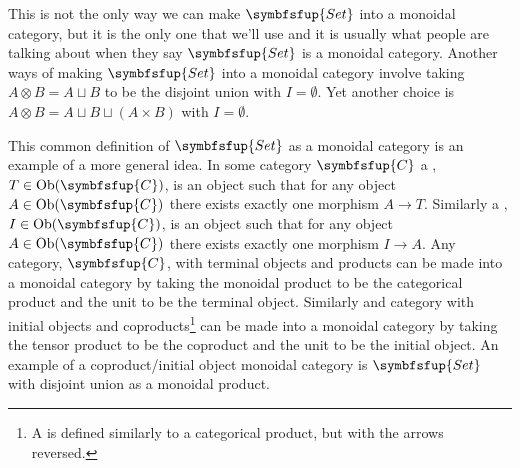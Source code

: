 \documentclass[fleqn]{NotesClass}
\makeatletter
\newcommand{\cat}[1]{\symbfsfup{#1}}
\newcommand{\c@egory}[1]{\symbfsfup{#1}}
\newcommand{\Set}{\c@egory{Set}}
\DeclareMathOperator{\Ob}{Ob}
\makeatother
\begin{document}
    \begin{wrn}
        This is not the only way we can make \(\Set\) into a monoidal category, but it is the only one that we'll use and it is usually what people are talking about when they say \(\Set\) is a monoidal category.
        Another ways of making \(\Set\) into a monoidal category involve taking \(A \otimes B = A \sqcup B\) to be the disjoint union with \(I = \emptyset\).
        Yet another choice is \(A \otimes B = A \sqcup B \sqcup (A \times B)\) with \(I = \emptyset\).
    \end{wrn}
    
    This common definition of \(\Set\) as a monoidal category is an example of a more general idea.
    In some category \(\cat{C}\) a , \(T \in \Ob(\cat{C})\), is an object such that for any object \(A \in \Ob(\cat{C})\) there exists exactly one morphism \(A \to T\).
    Similarly a , \(I \in \Ob(\cat{C})\), is an object such that for any object \(A \in \Ob(\cat{C})\) there exists exactly one morphism \(I \to A\).
    Any category, \(\cat{C}\), with terminal objects and products can be made into a monoidal category by taking the monoidal product to be the categorical product and the unit to be the terminal object.
    Similarly and category with initial objects and coproducts\footnote{A  is defined similarly to a categorical product, but with the arrows reversed.} can be made into a monoidal category by taking the tensor product to be the coproduct and the unit to be the initial object.
    An example of a coproduct/initial object monoidal category is \(\Set\) with disjoint union as a monoidal product.
    
\end{document}
